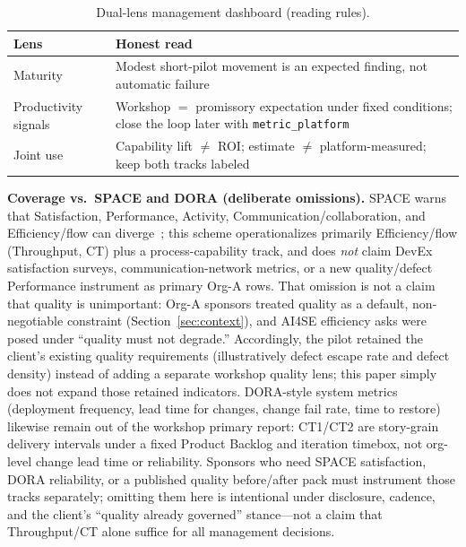 \documentclass[10pt,conference]{IEEEtran}
\begin{document}
\begin{table}[!t]
\centering
\caption{Dual-lens management dashboard (reading rules).}
\label{tab:dashboard}
\footnotesize
\setlength{\tabcolsep}{2pt}
\begin{tabular}{@{}>{\raggedright\arraybackslash}p{}>{\raggedright\arraybackslash}p{}@{}}
\toprule
Lens & Honest read \\
\midrule
Maturity & Modest short-pilot movement is an expected finding, not automatic failure \\
Productivity signals & Workshop $=$ promissory expectation under fixed conditions; close the loop later with \texttt{metric\_platform} \\
Joint use & Capability lift $\neq$ ROI; estimate $\neq$ platform-measured; keep both tracks labeled \\
\bottomrule
\end{tabular}
\end{table}

\textbf{Coverage vs.\ SPACE and DORA (deliberate omissions).}
SPACE warns that Satisfaction, Performance, Activity, Communication/collaboration, and Efficiency/flow can diverge~\cite{Forsgren2021SPACE}; this scheme operationalizes primarily Efficiency/flow (Throughput, CT) plus a process-capability track, and does \emph{not} claim DevEx satisfaction surveys, communication-network metrics, or a new quality/defect Performance instrument as primary Org-A rows.
That omission is not a claim that quality is unimportant: Org-A sponsors treated quality as a default, non-negotiable constraint (Section~\ref{sec:context}), and AI4SE efficiency asks were posed under ``quality must not degrade.''
Accordingly, the pilot retained the client's existing quality requirements (illustratively defect escape rate and defect density) instead of adding a separate workshop quality lens; this paper simply does not expand those retained indicators.
DORA-style system metrics (deployment frequency, lead time for changes, change fail rate, time to restore)~\cite{Forsgren2018Accelerate} likewise remain out of the workshop primary report: CT1/CT2 are story-grain delivery intervals under a fixed Product Backlog and iteration timebox, not org-level change lead time or reliability.
Sponsors who need SPACE satisfaction, DORA reliability, or a published quality before/after pack must instrument those tracks separately; omitting them here is intentional under disclosure, cadence, and the client's ``quality already governed'' stance---not a claim that Throughput/CT alone suffice for all management decisions.
\end{document}
